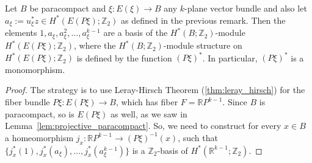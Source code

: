 \begin{proposition}\label{prop:basis_of_EP} Let $B$ be paracompact and $\xi:E(\xi)\to B$ any $k$-plane vector bundle and also let $a_{\xi}:=u_{\xi}^*z\in H^*(E(P\xi);\mathbb{Z}_2)$ as defined in the previous remark. Then the elements $1,a_{\xi},a_{\xi}^2,\ldots,a_{\xi}^{k-1}$ are a basis of the $H^*(B;\mathbb{Z}_2)$-module $H^*(E(P\xi);\mathbb{Z}_2)$, where the $H^*(B;\mathbb{Z}_2)$-module structure on $H^*(E(P\xi);\mathbb{Z}_2)$ is defined by the function $(P\xi)^*$. In particular, $(P\xi)^*$ is a monomorphism.
\end{proposition}
\begin{proof} The strategy is to use Leray-Hirsch Theorem (\ref{thm:leray_hirsch}) for the fiber bundle $P\xi:E(P\xi)\to B$, which has fiber $F=\mathbb{R}P^{k-1}$. Since $B$ is paracompact, so is $E(P\xi)$ as well, as we saw in Lemma~\ref{lem:projective_paracompact}. So, we need to construct for every $x\in B$ a homeomorphism $j_x:\mathbb{R}P^{k-1}\to(P\xi)^{-1}(x)$, such that $\{j_x^*(1),j_x^*(a_{\xi}),\ldots,j_x^*(a_{\xi}^{k-1})\}$ is a $\mathbb{Z}_2$-basis of $H^*(\mathbb{R}^{k-1};\mathbb{Z}_2)$.


\end{proof}
